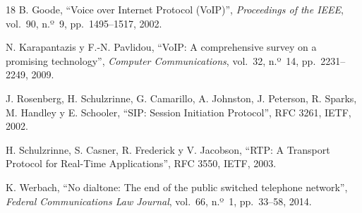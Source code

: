 \documentclass[12pt,a4paper]{article}
\begin{document}
\begin{thebibliography}{18}
    B. Goode, ``Voice over Internet Protocol (VoIP)'', \textit{Proceedings of the IEEE}, vol.~90, n.º~9, pp.~1495--1517, 2002.

    N. Karapantazis y F.-N. Pavlidou, ``VoIP: A comprehensive survey on a promising technology'', \textit{Computer Communications}, vol.~32, n.º~14, pp.~2231--2249, 2009.

    J. Rosenberg, H. Schulzrinne, G. Camarillo, A. Johnston, J. Peterson, R. Sparks, M. Handley y E. Schooler, ``SIP: Session Initiation Protocol'', RFC 3261, IETF, 2002.

    H. Schulzrinne, S. Casner, R. Frederick y V. Jacobson, ``RTP: A Transport Protocol for Real-Time Applications'', RFC 3550, IETF, 2003.

    K. Werbach, ``No dialtone: The end of the public switched telephone network'', \textit{Federal Communications Law Journal}, vol.~66, n.º~1, pp.~33--58, 2014.
\end{thebibliography}
\end{document}
